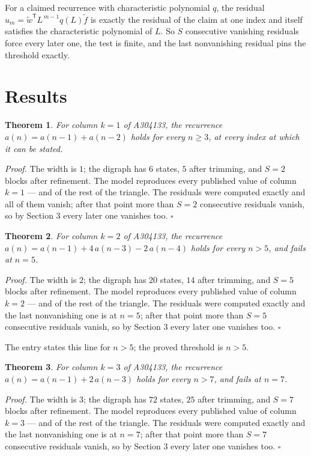 \documentclass[11pt]{article}
\newtheorem{theorem}{Theorem}
\theoremstyle{definition}
\begin{document}
For a claimed recurrence with characteristic polynomial $q$, the residual $u_m = \tilde w^{\mathsf T}L^{\,m-1}q(L)\tilde f$ is exactly the residual of the claim at one index and itself satisfies the characteristic polynomial of $L$. So $S$ consecutive vanishing residuals force every later one, the test is finite, and the last nonvanishing residual pins the threshold exactly.

\section{Results}

\begin{theorem} For column $k = 1$ of A304133, the recurrence $a(n) = a(n-1) + a(n-2)$ holds for every $n \ge 3$, at every index at which it can be stated.\end{theorem}

{\itshape Proof.} The width is $1$; the digraph has $6$ states, $5$ after trimming, and $S = 2$ blocks after refinement. The model reproduces every published value of column $k = 1$ --- and of the rest of the triangle. The residuals were computed exactly and all of them vanish; after that point more than $S = 2$ consecutive residuals vanish, so by Section 3 every later one vanishes too. $\square$

\begin{theorem} For column $k = 2$ of A304133, the recurrence $a(n) = a(n-1) + 4\,a(n-3) - 2\,a(n-4)$ holds for every $n > 5$, and fails at $n = 5$.\end{theorem}

{\itshape Proof.} The width is $2$; the digraph has $20$ states, $14$ after trimming, and $S = 5$ blocks after refinement. The model reproduces every published value of column $k = 2$ --- and of the rest of the triangle. The residuals were computed exactly and the last nonvanishing one is at $n = 5$; after that point more than $S = 5$ consecutive residuals vanish, so by Section 3 every later one vanishes too. $\square$

The entry states this line for $n > 5$; the proved threshold is $n > 5$.

\begin{theorem} For column $k = 3$ of A304133, the recurrence $a(n) = a(n-1) + 2\,a(n-3)$ holds for every $n > 7$, and fails at $n = 7$.\end{theorem}

{\itshape Proof.} The width is $3$; the digraph has $72$ states, $25$ after trimming, and $S = 7$ blocks after refinement. The model reproduces every published value of column $k = 3$ --- and of the rest of the triangle. The residuals were computed exactly and the last nonvanishing one is at $n = 7$; after that point more than $S = 7$ consecutive residuals vanish, so by Section 3 every later one vanishes too. $\square$
\end{document}
